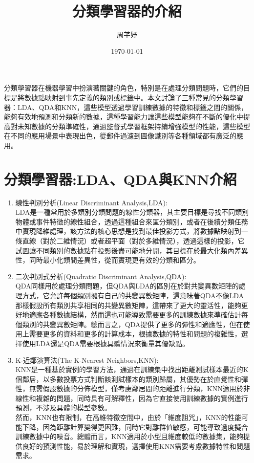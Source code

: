 \documentclass[12pt, a4paper]{article}
\title{分類學習器的介紹}
\author{{\SM 周芊妤}}
\date{{\TT \today}}
\begin{document}
\maketitle
\fontsize{12}{22 pt}\selectfont

分類學習器在機器學習中扮演著關鍵的角色，特別是在處理分類問題時，它們的目標是將數據點映射到事先定義的類別或標籤中。本文討論了三種常見的分類學習器\;：\;LDA、QDA和KNN，這些模型透過學習訓練數據的特徵和標籤之間的關係，能夠有效地預測和分類新的數據，這種學習能力讓這些模型能夠在不斷的優化中提高對未知數據的分類準確性，通過監督式學習框架持續增強模型的性能，這些模型在不同的應用場景中表現出色，從郵件過濾到圖像識別等各種領域都有廣泛的應用。

\section{分類學習器\;:\;LDA、QDA與KNN介紹}
\begin{enumerate}
\item 線性判別分析(Linear Discriminant Analysis,\;LDA)\;:\\
LDA是一種常用於多類別分類問題的線性分類器，其主要目標是尋找不同類別物體或事件特徵的線性組合，透過這種組合來區分類別，或者在後續分類任務中實現降維處理，該方法的核心思想是找到最佳投影方式，將數據點映射到一條直線（對於二維情況）或者超平面（對於多維情況），透過這樣的投影，它試圖讓不同類別的數據點在投影後盡可能地分開，其目標在於最大化類內差異性，同時最小化類間差異性，從而實現更有效的分類和區分。

\item 二次判別式分析(Quadratic Discriminant Analysis,\;QDA)\;:\\
QDA同樣用於處理分類問題，但QDA與LDA的區別在於對共變異數矩陣的處理方式，它允許每個類別擁有自己的共變異數矩陣，這意味著QDA不像LDA那樣假設所有類別共享相同的共變異數矩陣，這帶來了更大的靈活性，能夠更好地適應各種數據結構，然而這也可能導致需要更多的訓練數據來準確估計每個類別的共變異數矩陣。總而言之，QDA提供了更多的彈性和適應性，但在使用上需要更多的資料和更多的計算成本，根據數據的特性和問題的複雜性，選擇使用LDA還是QDA需要根據具體情況來衡量其優缺點。

\item K-近鄰演算法(The K-Nearest Neighbors,\;KNN)\;:\\
KNN是一種基於實例的學習方法，通過在訓練集中找出距離測試樣本最近的K個鄰居，以多數投票方式判斷該測試樣本的類別歸屬，其優勢在於直覺性和彈性，無需假設數據的分佈模型，僅考慮鄰居間的距離進行分類，KNN適用於非線性和複雜的問題，同時具有可解釋性，因為它直接使用訓練數據的實例進行預測，不涉及具體的模型參數。\\
然而，KNN也有限制，在高維特徵空間中，由於「維度詛咒」，KNN的性能可能下降，因為距離計算變得更困難，同時它對離群值敏感，可能導致過度擬合訓練數據中的噪音。總體而言，KNN適用於小型且維度較低的數據集，能夠提供良好的預測性能，易於理解和實現，選擇使用KNN需要考慮數據特性和問題需求。
\end{enumerate}
\end{document}
